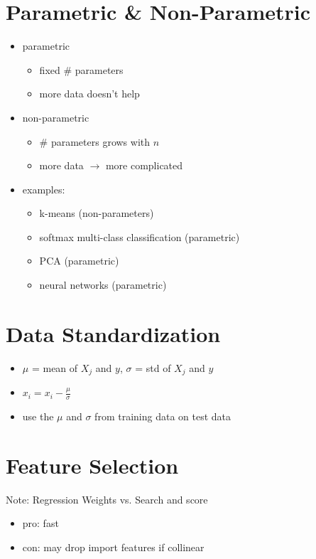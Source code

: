 \documentclass[10pt,landscape,a4paper]{article}
\begin{document}
\begin{multicols*}{5}
\section{Parametric \& Non-Parametric}
\begin{itemize}
    \item parametric
    \begin{itemize}
        \item fixed \# parameters
        \item more data doesn't help
    \end{itemize}
    \item non-parametric
    \begin{itemize}
        \item \# parameters grows with \(n\)
        \item more data \(\rightarrow \)  more complicated
    \end{itemize}
    \item examples:
    \begin{itemize}
        \item k-means (non-parameters)
        \item softmax multi-class classification (parametric)
        \item PCA (parametric)
        \item neural networks (parametric)
    \end{itemize}
\end{itemize}

\section{Data Standardization}
\begin{itemize}
    \item \(\mu \) = mean of \(X_j\) and \(y\), \(\sigma \) = std of \(X_j\) and \(y\)
    \item \(x_i = x_i - \frac{\mu}{\sigma}\)
    \item use the \(\mu \) and \(\sigma \) from training data on test data
\end{itemize}

\section{Feature Selection}

Note:
Regression Weights vs. Search and score
\begin{itemize}
    \item pro: fast
    \item con: may drop import features if collinear
\end{itemize}


\end{multicols*}
\end{document}
